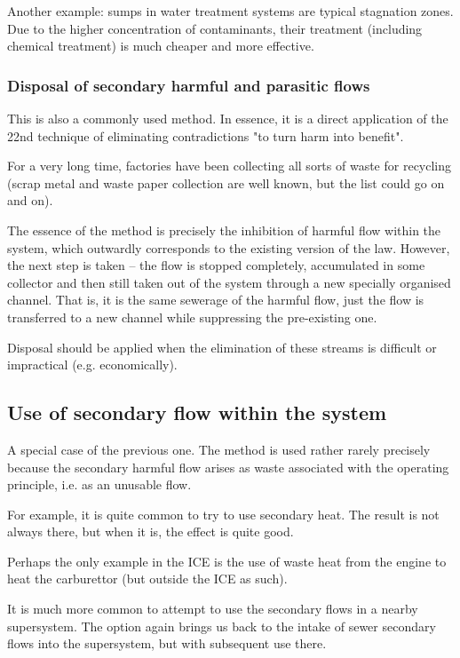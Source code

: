 \documentclass[a4paper,11pt]{article}
\begin{document}
Another example: sumps in water treatment systems are typical stagnation
zones. Due to the higher concentration of contaminants, their treatment
(including chemical treatment) is much cheaper and more effective.

\subsubsection{Disposal of secondary harmful and parasitic flows}

This is also a commonly used method. In essence, it is a direct application of
the 22nd technique of eliminating contradictions "to turn harm into benefit".

For a very long time, factories have been collecting all sorts of waste for
recycling (scrap metal and waste paper collection are well known, but the list
could go on and on).

The essence of the method is precisely the inhibition of harmful flow within
the system, which outwardly corresponds to the existing version of the law.
However, the next step is taken -- the flow is stopped completely, accumulated
in some collector and then still taken out of the system through a new
specially organised channel. That is, it is the same sewerage of the harmful
flow, just the flow is transferred to a new channel while suppressing the
pre-existing one.

Disposal should be applied when the elimination of these streams is difficult
or impractical (e.g. economically).

\subsection{Use of secondary flow within the system}

A special case of the previous one. The method is used rather rarely precisely
because the secondary harmful flow arises as waste associated with the
operating principle, i.e. as an unusable flow.

For example, it is quite common to try to use secondary heat. The result is
not always there, but when it is, the effect is quite good.

Perhaps the only example in the ICE is the use of waste heat from the engine
to heat the carburettor (but outside the ICE as such).

It is much more common to attempt to use the secondary flows in a nearby
supersystem. The option again brings us back to the intake of sewer secondary
flows into the supersystem, but with subsequent use there.
\end{document}

